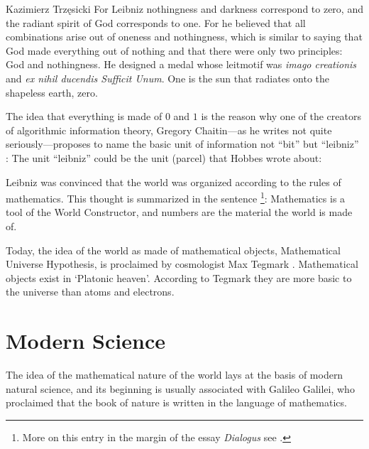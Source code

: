 \begin{artengenv}{Kazimierz Trzęsicki}
For Leibniz \parencite*{list1697} nothingness and darkness correspond to zero, and the radiant spirit of God corresponds to one. For he believed that all combinations arise out of oneness and nothingness, which is similar to saying that God made everything out of nothing and that there were only two principles: God and nothingness. He designed a medal whose leitmotif was \emph{imago creationis} and \emph{ex nihil ducendis Sufficit Unum}. One is the sun that radiates onto the shapeless earth, zero.

The idea that everything is made of $0$ and $1$ is the reason why one of the creators of algorithmic information theory, Gregory Chaitin---as he writes not quite seriously---proposes to name the basic unit of information not ``bit'' but ``leibniz'' \parencites{Chaitin2004}[cf.][]{Trzesicki2006a}:
The unit ``leibniz'' could be the unit (parcel) that Hobbes \parencite*[Chapter V. Of Reason, and Science]{Hobbes1651} wrote about:


Leibniz was convinced that the world was organized according to the rules of mathematics. This thought is summarized in the sentence \parencite*[p.191] {Leibniz1677}\footnote{More on this entry in the margin of the essay \emph{Dialogus} \parencite{Leibniz1677} see \parencite{Kopania2018}.}:
Mathematics is a tool of the World Constructor, and numbers are the material the world is made of.


Today, the idea of the world as made of mathematical objects, Mathematical Universe Hypothesis, is proclaimed by cosmologist Max Tegmark \parencite*{Tegmark2008,Tegmark2014}. Mathematical objects exist in `Platonic heaven'. According to Tegmark they are more basic to the universe than atoms and electrons.


\section{Modern Science} 

The idea of the mathematical nature of the world lays at the basis of modern natural science, and its beginning is usually associated with Galileo Galilei, who proclaimed that the book of nature is written in the language of mathematics.


\end{artengenv}
